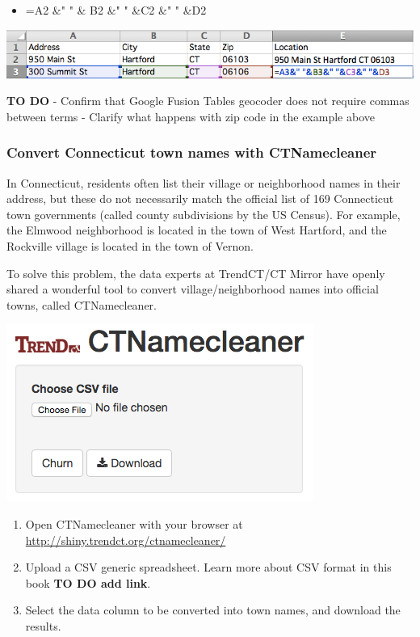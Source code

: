 \documentclass[
  english,
]{book}
\providecommand{\tightlist}{%
  \setlength{\itemsep}{0pt}\setlength{\parskip}{0pt}}
\begin{document}
\begin{itemize}
\tightlist
\item
  =A2 \&" " \& B2 \&" " \&C2 \&" " \&D2
\end{itemize}

\includegraphics{images/04-clean/SpreadsheetCombineTerms.png}

\textbf{TO DO}
- Confirm that Google Fusion Tables geocoder does not require commas between terms
- Clarify what happens with zip code in the example above

\hypertarget{convert-connecticut-town-names-with-ctnamecleaner}{%
\subsubsection*{Convert Connecticut town names with CTNamecleaner}\label{convert-connecticut-town-names-with-ctnamecleaner}}

In Connecticut, residents often list their village or neighborhood names in their address, but these do not necessarily match the official list of 169 Connecticut town governments (called county subdivisions by the US Census). For example, the Elmwood neighborhood is located in the town of West Hartford, and the Rockville village is located in the town of Vernon.

To solve this problem, the data experts at TrendCT/CT Mirror have openly shared a wonderful tool to convert village/neighborhood names into official towns, called CTNamecleaner.

\includegraphics{images/04-clean/CTNamecleaner.png}

\begin{enumerate}
\def\labelenumi{\arabic{enumi}.}
\tightlist
\item
  Open CTNamecleaner with your browser at \url{http://shiny.trendct.org/ctnamecleaner/}
\item
  Upload a CSV generic spreadsheet. Learn more about CSV format in this book \textbf{TO DO add link}.
\item
  Select the data column to be converted into town names, and download the results.
\end{enumerate}
\end{document}
